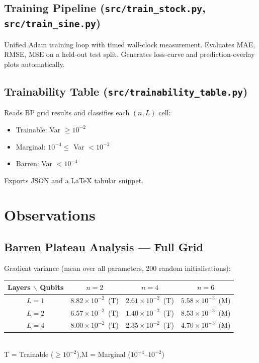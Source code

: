 \documentclass[11pt,a4paper]{article}
\begin{document}
\subsection{Training Pipeline (\texttt{src/train\_stock.py}, \texttt{src/train\_sine.py})}

Unified Adam training loop with timed wall-clock measurement. Evaluates MAE, RMSE, MSE on a held-out test split. Generates loss-curve and prediction-overlay plots automatically.

\subsection{Trainability Table (\texttt{src/trainability\_table.py})}

Reads BP grid results and classifies each $(n,L)$ cell:
\begin{itemize}
  \item Trainable: Var $\ge 10^{-2}$
  \item Marginal: $10^{-4} \le$ Var $< 10^{-2}$
  \item Barren: Var $< 10^{-4}$
\end{itemize}
Exports JSON and a \LaTeX{} tabular snippet.

\section{Observations}

\subsection{Barren Plateau Analysis — Full Grid}

Gradient variance (mean over all parameters, 200 random initialisations):

\begin{center}
\begin{tabular}{@{}cccc@{}}
\toprule
\textbf{Layers} $\backslash$ \textbf{Qubits} & $n=2$ & $n=4$ & $n=6$ \\
\midrule
$L=1$ & $8.82\times10^{-2}$~(T) & $2.61\times10^{-2}$~(T) & $5.58\times10^{-3}$~(M) \\
$L=2$ & $6.57\times10^{-2}$~(T) & $1.40\times10^{-2}$~(T) & $8.53\times10^{-3}$~(M) \\
$L=4$ & $8.00\times10^{-2}$~(T) & $2.35\times10^{-2}$~(T) & $4.70\times10^{-3}$~(M) \\
\bottomrule
\end{tabular}\\[3pt]
\small T = Trainable ($\ge 10^{-2}$),\quad M = Marginal ($10^{-4}$--$10^{-2}$)
\end{center}
\end{document}

